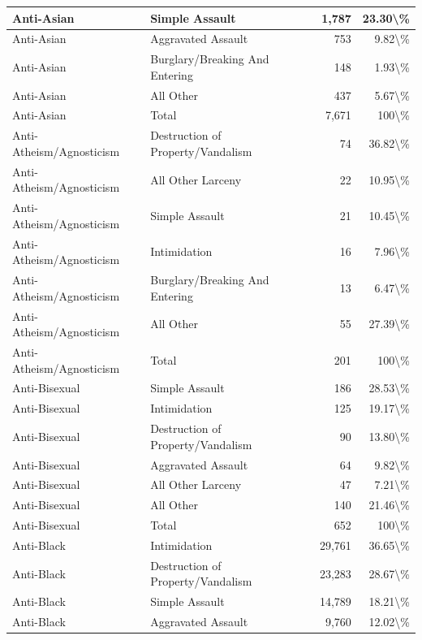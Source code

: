 \documentclass[
]{krantz}
\begin{document}
\begin{longtable}[t]{l|l|r|r}
\hline
Anti-Asian & Simple Assault & 1,787 & 23.30\textbackslash{}\%\\
\hline
Anti-Asian & Aggravated Assault & 753 & 9.82\textbackslash{}\%\\
\hline
Anti-Asian & Burglary/Breaking And Entering & 148 & 1.93\textbackslash{}\%\\
\hline
Anti-Asian & All Other & 437 & 5.67\textbackslash{}\%\\
\hline
Anti-Asian & Total & 7,671 & 100\textbackslash{}\%\\
\hline
Anti-Atheism/Agnosticism & Destruction of Property/Vandalism & 74 & 36.82\textbackslash{}\%\\
\hline
Anti-Atheism/Agnosticism & All Other Larceny & 22 & 10.95\textbackslash{}\%\\
\hline
Anti-Atheism/Agnosticism & Simple Assault & 21 & 10.45\textbackslash{}\%\\
\hline
Anti-Atheism/Agnosticism & Intimidation & 16 & 7.96\textbackslash{}\%\\
\hline
Anti-Atheism/Agnosticism & Burglary/Breaking And Entering & 13 & 6.47\textbackslash{}\%\\
\hline
Anti-Atheism/Agnosticism & All Other & 55 & 27.39\textbackslash{}\%\\
\hline
Anti-Atheism/Agnosticism & Total & 201 & 100\textbackslash{}\%\\
\hline
Anti-Bisexual & Simple Assault & 186 & 28.53\textbackslash{}\%\\
\hline
Anti-Bisexual & Intimidation & 125 & 19.17\textbackslash{}\%\\
\hline
Anti-Bisexual & Destruction of Property/Vandalism & 90 & 13.80\textbackslash{}\%\\
\hline
Anti-Bisexual & Aggravated Assault & 64 & 9.82\textbackslash{}\%\\
\hline
Anti-Bisexual & All Other Larceny & 47 & 7.21\textbackslash{}\%\\
\hline
Anti-Bisexual & All Other & 140 & 21.46\textbackslash{}\%\\
\hline
Anti-Bisexual & Total & 652 & 100\textbackslash{}\%\\
\hline
Anti-Black & Intimidation & 29,761 & 36.65\textbackslash{}\%\\
\hline
Anti-Black & Destruction of Property/Vandalism & 23,283 & 28.67\textbackslash{}\%\\
\hline
Anti-Black & Simple Assault & 14,789 & 18.21\textbackslash{}\%\\
\hline
Anti-Black & Aggravated Assault & 9,760 & 12.02\textbackslash{}\%\\

\end{longtable}
\end{document}
